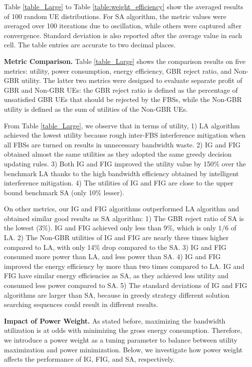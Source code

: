 \documentclass[conference]{IEEEtran}
\begin{document}
Table \ref{table_Large} to Table \ref{table:weight_efficiency} show the averaged results of 100 random UE distributions. For SA algorithm, the metric values were averaged over 100 iterations due to oscillation, while others were captured after convergence. Standard deviation is also reported after the average value in each cell. The table entries are accurate to two decimal places.


\noindent \textbf{Metric Comparison.} Table \ref{table_Large} shows the comparison results on five metrics: utility, power consumption, energy efficiency, GBR reject ratio, and Non-GBR utility. The latter two metrics were designed to evaluate separate profit of GBR and Non-GBR UEs: the GBR reject ratio is defined as the percentage of unsatisfied GBR UEs that should be rejected by the FBSs, while the Non-GBR utility is defined as the sum of utilities of the Non-GBR UEs. 


From Table \ref{table_Large}, we observe that in terms of utility, 1) LA algorithm achieved the lowest utility because rough inter-FBS interference mitigation when all FBSs are turned on results in unnecessary bandwidth waste. 2) IG and FIG obtained almost the same utilities as they adopted the same greedy decision updating rules. 3) Both IG and FIG improved the utility value by 150\% over the benchmark LA thanks to the high bandwidth efficiency obtained by intelligent interference mitigation. 4) The utilities of IG and FIG are close to the upper bound benchmark SA (only 10\% lesser).


On other metrics, our IG and FIG algorithms outperformed LA algorithm and obtained similar good results as SA algorithm: 1) The GBR reject ratio of SA is the lowest (3\%). IG and FIG achieved only less than 9\%, which is only ${1}/{6}$ of LA. 2) The Non-GBR utilities of IG and FIG are nearly three times higher compared to LA, with only 14\% drop compared to the SA. 3) IG and FIG consumed more power than LA, and less power than SA. 4) IG and FIG improved the energy efficiency by more than two times compared to LA. IG and FIG have similar energy efficiencies as SA, as they achieved less utility and consumed less power compared to SA. 5) The standard deviations of IG and FIG algorithms are larger than SA, because in greedy strategy different solution searching sequences could result in different results.

\noindent \textbf{Impact of Power Weight.} As stated before, maximizing the bandwidth utilization is at odds with minimizing the gross energy consumption. Therefore, we introduce a power weight as a tuning parameter to balance between utility maximization and power minimization. Below, we investigate how power weight affects the performance of IG, FIG, and SA, respectively.
\end{document}
